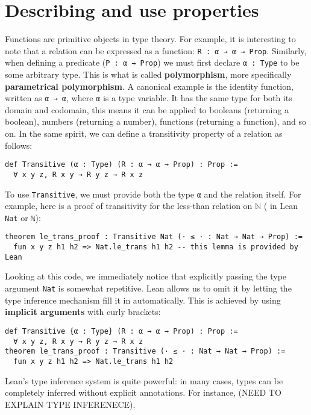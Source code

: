 \section{Describing and use properties}
Functions are primitive objects in type theory.
For example, it is interesting to note that a relation can be expressed as a function:
\lstinline[language=lean]|R : α → α → Prop|.
Similarly, when defining a predicate (\lstinline[language=lean]|P : α → Prop|) we must first declare
\lstinline[language=lean]|α : Type| to be some arbitrary type.
This is what is called \textbf{polymorphism}, more specifically \textbf{parametrical polymorphism}.
A canonical example is the identity function, written as
\lstinline[language=lean]|α → α|, where
\lstinline[language=lean]|α| is a type variable.
It has the same type for
both its domain and codomain, this means it can be
applied to booleans (returning a boolean), numbers (returning a number),
functions (returning a function), and so on.
In the same spirit, we can define a transitivity property of a relation as follows:
\begin{lstlisting}[language=lean]
def Transitive (α : Type) (R : α → α → Prop) : Prop :=
  ∀ x y z, R x y → R y z → R x z
\end{lstlisting}
To use \lstinline[language=lean]|Transitive|, we must provide both the type
\lstinline[language=lean]|α| and the relation itself.
For example, here is a proof of transitivity for the less-than relation on
$\mathbb{N}$ ( in Lean \lstinline[language=lean]|Nat| or \lstinline[language=lean]|ℕ|):
\begin{lstlisting}[language=lean]
theorem le_trans_proof : Transitive Nat (· ≤ · : Nat → Nat → Prop) :=
  fun x y z h1 h2 => Nat.le_trans h1 h2 -- this lemma is provided by Lean 
\end{lstlisting}
Looking at this code, we immediately notice that explicitly
passing the type argument \lstinline[language=lean]|Nat| is somewhat repetitive.
Lean allows us to omit it by letting the type inference mechanism fill it in automatically.
This is achieved by using \textbf{implicit arguments} with curly brackets:
\begin{lstlisting}[language=lean]
def Transitive {α : Type} (R : α → α → Prop) : Prop :=
  ∀ x y z, R x y → R y z → R x z
theorem le_trans_proof : Transitive (· ≤ · : Nat → Nat → Prop) :=
  fun x y z h1 h2 => Nat.le_trans h1 h2 
\end{lstlisting}
Lean's type inference system is quite powerful: in many cases, types can be completely
inferred without explicit annotations. For instance, (NEED TO EXPLAIN TYPE INFERENECE).
